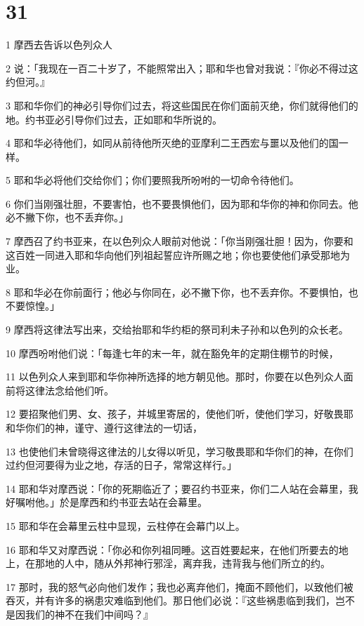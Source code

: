 \chapter{31}

\par 1 摩西去告诉以色列众人
\par 2 说：「我现在一百二十岁了，不能照常出入；耶和华也曾对我说：『你必不得过这约但河。』
\par 3 耶和华你们的神必引导你们过去，将这些国民在你们面前灭绝，你们就得他们的地。约书亚必引导你们过去，正如耶和华所说的。
\par 4 耶和华必待他们，如同从前待他所灭绝的亚摩利二王西宏与噩以及他们的国一样。
\par 5 耶和华必将他们交给你们；你们要照我所吩咐的一切命令待他们。
\par 6 你们当刚强壮胆，不要害怕，也不要畏惧他们，因为耶和华你的神和你同去。他必不撇下你，也不丢弃你。」
\par 7 摩西召了约书亚来，在以色列众人眼前对他说：「你当刚强壮胆！因为，你要和这百姓一同进入耶和华向他们列祖起誓应许所赐之地；你也要使他们承受那地为业。
\par 8 耶和华必在你前面行；他必与你同在，必不撇下你，也不丢弃你。不要惧怕，也不要惊惶。」
\par 9 摩西将这律法写出来，交给抬耶和华约柜的祭司利未子孙和以色列的众长老。
\par 10 摩西吩咐他们说：「每逢七年的末一年，就在豁免年的定期住棚节的时候，
\par 11 以色列众人来到耶和华你神所选择的地方朝见他。那时，你要在以色列众人面前将这律法念给他们听。
\par 12 要招聚他们男、女、孩子，并城里寄居的，使他们听，使他们学习，好敬畏耶和华你们的神，谨守、遵行这律法的一切话，
\par 13 也使他们未曾晓得这律法的儿女得以听见，学习敬畏耶和华你们的神，在你们过约但河要得为业之地，存活的日子，常常这样行。」
\par 14 耶和华对摩西说：「你的死期临近了；要召约书亚来，你们二人站在会幕里，我好嘱咐他。」於是摩西和约书亚去站在会幕里。
\par 15 耶和华在会幕里云柱中显现，云柱停在会幕门以上。
\par 16 耶和华又对摩西说：「你必和你列祖同睡。这百姓要起来，在他们所要去的地上，在那地的人中，随从外邦神行邪淫，离弃我，违背我与他们所立的约。
\par 17 那时，我的怒气必向他们发作；我也必离弃他们，掩面不顾他们，以致他们被吞灭，并有许多的祸患灾难临到他们。那日他们必说：『这些祸患临到我们，岂不是因我们的神不在我们中间吗？』
